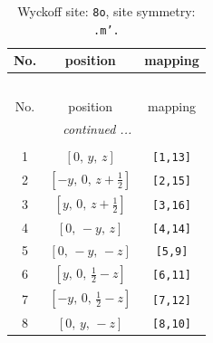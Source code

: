\documentclass[fleqn,8pt]{jsarticle}
\begin{document}
\renewcommand{\arraystretch}{1.2}
\begin{longtable}{ccc}
\caption{Wyckoff site: {\tt 8o}, site symmetry: {\tt .m'.}}
 \\
 \hline \hline
No. & position & mapping \\ \hline \endfirsthead

\multicolumn{2}{l}{\tablename\ \thetable{}} \\
 \hline \hline
No. & position & mapping \\ \hline \endhead

 \hline \hline
\multicolumn{2}{r}{\footnotesize\it continued ...} \\ \endfoot

 \hline \hline
\multicolumn{2}{r}{} \\ \endlastfoot

1 & $\left[ 0,\, y,\, z \right]$ & {\tt [1,13]} \\ \hline
2 & $\left[ - y,\, 0,\, z + \frac{1}{2} \right]$ & {\tt [2,15]} \\ \hline
3 & $\left[ y,\, 0,\, z + \frac{1}{2} \right]$ & {\tt [3,16]} \\ \hline
4 & $\left[ 0,\, - y,\, z \right]$ & {\tt [4,14]} \\ \hline
5 & $\left[ 0,\, - y,\, - z \right]$ & {\tt [5,9]} \\ \hline
6 & $\left[ y,\, 0,\, \frac{1}{2} - z \right]$ & {\tt [6,11]} \\ \hline
7 & $\left[ - y,\, 0,\, \frac{1}{2} - z \right]$ & {\tt [7,12]} \\ \hline
8 & $\left[ 0,\, y,\, - z \right]$ & {\tt [8,10]} \\
\end{longtable}
\renewcommand{\arraystretch}{1.2}
\end{document}
